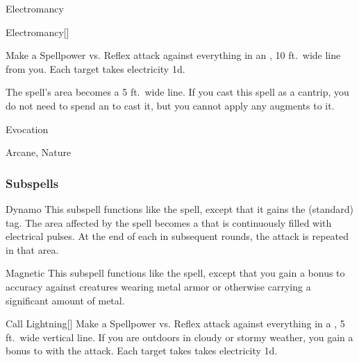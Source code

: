 \newpage
\begin{spellsection}{Electromancy}

\begin{spellheader}
\end{spellheader}


\begin{ability}{Electromancy}[]

Make a Spellpower vs. Reflex attack against everything in an \arealarge, 10 ft.\ wide line from you.
\hit Each target takes electricity  \minus1d.

\end{ability}



 The spell's area becomes a 5 ft.\ wide \areamed line. If you cast this spell as a cantrip,
you do not need to spend an  to cast it,
but you cannot apply any augments to it.


 Evocation

 Arcane, Nature
\end{spellsection}


\subsubsection{Subspells}


\begin{ability}[\nth{2}]{Dynamo}
This subspell functions like the  spell, except that it gains the  (standard) tag.
The area affected by the spell becomes a  that is continuously filled with electrical pulses.
At the end of each  in subsequent rounds, the attack is repeated in that area.
\end{ability}
\vspace{0.25em}


\begin{ability}[\nth{2}]{Magnetic}
This subspell functions like the  spell, except that you gain a  bonus to accuracy against creatures wearing metal armor or otherwise carrying a significant amount of metal.
\end{ability}
\vspace{0.25em}


\begin{ability}[\nth{3}]{Call Lightning}[]
Make a Spellpower vs. Reflex attack against everything in a \arealarge, 5 ft.\ wide vertical line.
If you are outdoors in cloudy or stormy weather, you gain a  bonus to  with the attack.
\hit Each target takes takes electricity  \plus1d.
\end{ability}
\vspace{0.25em}


